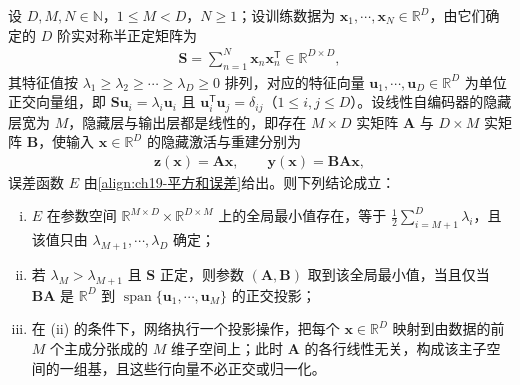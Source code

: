 \documentclass[../../main.tex]{subfiles}
\begin{document}
\begin{theorem}[线性自编码器的最优解与主成分分析]\label{theorem:ch19-线性AE与PCA}
设 $D,M,N\in\mathbb{N}$，$1\leqslant M<D$，$N\geqslant1$；设训练数据为 $\bm{x}_{1},\cdots,\bm{x}_{N}\in\mathbb{R}^{D}$，由它们确定的 $D$ 阶实对称半正定矩阵为
\begin{align*}
\bm{S}=\sum_{n=1}^{N}\bm{x}_n\bm{x}_n^{\mathsf T}\in\mathbb{R}^{D\times D},
\end{align*}
其特征值按 $\lambda_1\geqslant\lambda_2\geqslant\cdots\geqslant\lambda_D\geqslant0$ 排列，对应的特征向量 $\bm{u}_{1},\cdots,\bm{u}_{D}\in\mathbb{R}^{D}$ 为单位正交向量组，即 $\bm{S}\bm{u}_{i}=\lambda_{i}\bm{u}_{i}$ 且 $\bm{u}_{i}^{\mathsf T}\bm{u}_{j}=\delta_{ij}$（$1\leqslant i,j\leqslant D$）。设线性自编码器的隐藏层宽为 $M$，隐藏层与输出层都是线性的，即存在 $M\times D$ 实矩阵 $\bm{A}$ 与 $D\times M$ 实矩阵 $\bm{B}$，使输入 $\bm{x}\in\mathbb{R}^{D}$ 的隐藏激活与重建分别为
\begin{align*}
\bm{z}(\bm{x})=\bm{A}\bm{x},\qquad \bm{y}(\bm{x})=\bm{B}\bm{A}\bm{x},
\end{align*}
误差函数 $E$ 由\eqref{align:ch19-平方和误差}给出。则下列结论成立：
\begin{enumerate}[(i)]
\item $E$ 在参数空间 $\mathbb{R}^{M\times D}\times\mathbb{R}^{D\times M}$ 上的全局最小值存在，等于 $\frac{1}{2}\sum_{i=M+1}^{D}\lambda_i$，且该值只由 $\lambda_{M+1},\cdots,\lambda_{D}$ 确定；
\item 若 $\lambda_{M}>\lambda_{M+1}$ 且 $\bm{S}$ 正定，则参数 $(\bm{A},\bm{B})$ 取到该全局最小值，当且仅当 $\bm{B}\bm{A}$ 是 $\mathbb{R}^{D}$ 到 $\operatorname{span}\{\bm{u}_1,\cdots,\bm{u}_M\}$ 的正交投影；
\item 在 (ii) 的条件下，网络执行一个投影操作，把每个 $\bm{x}\in\mathbb{R}^{D}$ 映射到由数据的前 $M$ 个主成分张成的 $M$ 维子空间上；此时 $\bm{A}$ 的各行线性无关，构成该主子空间的一组基，且这些行向量不必正交或归一化。
\end{enumerate}
\end{theorem}
\end{document}
